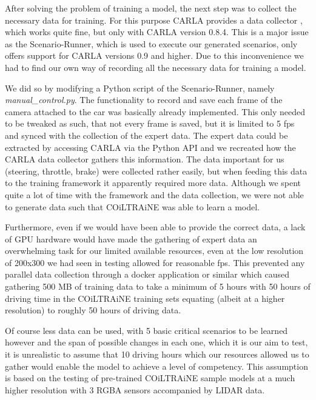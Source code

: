 \documentclass[conference, a4paper, 11pt]{IEEEtran}
\begin{document}
	After solving the problem of training a model, the next step was to collect the necessary data for training. For this purpose CARLA provides a data collector \cite{CARLA:DataCollector}, which works quite fine, but only with CARLA version 0.8.4. This is a major issue as the Scenario-Runner, which is used to execute our generated scenarios, only  offers support for CARLA versions 0.9 and higher. Due to this inconvenience we had to find our own way of recording all the necessary data for training a model.
	
	We did so by modifying a Python script of the Scenario-Runner, namely \textit{manual\_control.py}. The functionality to record and save each frame of the camera attached to the car was basically already implemented. This only needed to be tweaked as such, that not every frame is saved, but it is limited to 5 fps and synced with the collection of the expert data. The expert data could be extracted by accessing CARLA via the Python API and we recreated how the CARLA data collector gathers this information. The data important for us (steering, throttle, brake) were collected rather easily, but when feeding this data to the training framework it apparently required more data.
	Although we spent quite a lot of time with the framework and the data collection, we were not able to generate data such that COiLTRAiNE was able to learn a model.
	
	Furthermore, even if we would have been able to provide the correct data, a lack of GPU hardware would have made the gathering of expert data an overwhelming task for our limited available resources, even at the low resolution of 200x300 we had seen in testing allowed for reasonable fps. This prevented any parallel data collection through a docker application or similar which caused gathering 500 MB of training data to take a minimum of 5 hours with 50 hours of driving time in the COiLTRAiNE training sets equating (albeit at a higher resolution) to roughly 50 hours of driving data.
	
	Of course less data can be used, with 5 basic critical scenarios to be learned however and the span of possible changes in each one, which it is our aim to test, it is unrealistic to assume that 10 driving hours which our resources allowed us to gather would enable the model to achieve a level of competency. This assumption is based on the testing of pre-trained COiLTRAiNE sample models at a much higher resolution with 3 RGBA sensors accompanied by LIDAR data.
	
\end{document}
